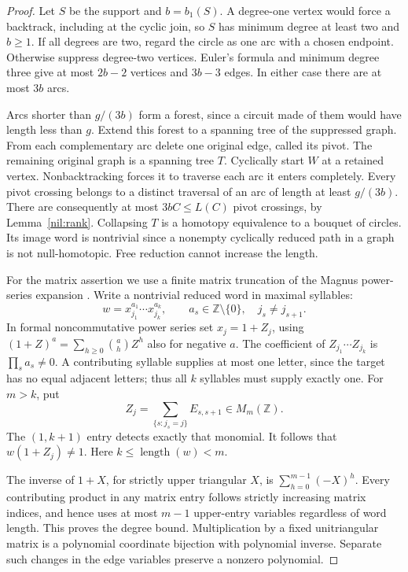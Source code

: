 \begin{proof}
Let \(S\) be the support and \(b=b_1(S)\). A degree-one vertex would
force a backtrack, including at the cyclic join, so \(S\) has minimum
degree at least two and \(b\ge1\). If all degrees are two, regard the
circle as one arc with a chosen endpoint. Otherwise suppress
degree-two vertices. Euler's formula and minimum degree three give
at most \(2b-2\) vertices and \(3b-3\) edges. In either case there
are at most \(3b\) arcs.

Arcs shorter than \(g/(3b)\) form a forest, since a circuit made of
them would have length less than \(g\). Extend this forest to a
spanning tree of the suppressed graph. From each complementary arc
delete one original edge, called its pivot. The remaining original
graph is a spanning tree \(T\). Cyclically start \(W\) at a retained
vertex. Nonbacktracking forces it to traverse each arc it enters
completely. Every pivot crossing belongs to a distinct traversal
of an arc of length at least \(g/(3b)\). There are consequently
at most \(3bC\le L(C)\) pivot crossings, by Lemma~\ref{nil:rank}.
Collapsing \(T\) is a homotopy equivalence to a bouquet of circles.
Its image word is nontrivial since a nonempty cyclically reduced
path in a graph is not null-homotopic. Free reduction cannot
increase the length.

For the matrix assertion we use a finite matrix truncation of the Magnus
power-series expansion \cite{Magnus1935}. Write a nontrivial reduced word
in maximal syllables:
\[
 w=x_{j_1}^{a_1}\cdots x_{j_k}^{a_k},\qquad
 a_s\in\mathbb Z\setminus\{0\},\quad j_s\ne j_{s+1}.
\]
In formal noncommutative power series set \(x_j=1+Z_j\), using
\((1+Z)^a=\sum_{h\ge0}\binom ah Z^h\) also for negative \(a\).
The coefficient of \(Z_{j_1}\cdots Z_{j_k}\) is
\(\prod_s a_s\ne0\). A contributing syllable supplies at most one
letter, since the target has no equal adjacent letters; thus all
\(k\) syllables must supply exactly one. For \(m>k\), put
\[
 Z_j=\sum_{\{s:j_s=j\}}E_{s,s+1}\in M_m(\mathbb Z).
\]
The \((1,k+1)\) entry detects exactly that monomial. It follows that
\(w(1+Z_j)\ne1\). Here \(k\le\operatorname{length}(w)<m\).

The inverse of \(1+X\), for strictly upper triangular \(X\), is
\(\sum_{h=0}^{m-1}(-X)^h\). Every contributing product in any
matrix entry follows strictly increasing matrix indices, and hence
uses at most \(m-1\) upper-entry variables regardless of word length.
This proves the degree bound. Multiplication by a fixed
unitriangular matrix is a polynomial coordinate bijection with
polynomial inverse. Separate such changes in the edge variables
preserve a nonzero polynomial.
\end{proof}

